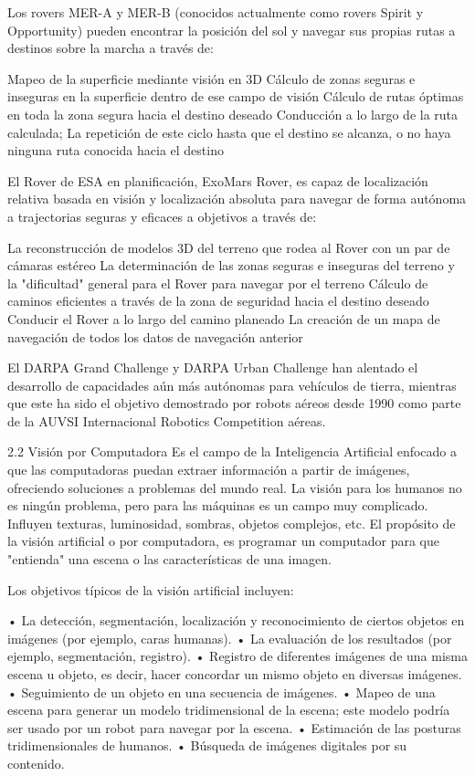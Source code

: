 Los rovers MER-A y MER-B (conocidos actualmente como rovers Spirit y Opportunity) pueden encontrar la posición del sol y navegar sus propias rutas a destinos sobre la marcha a través de: 

Mapeo de la superficie mediante visión en 3D 
Cálculo de zonas seguras e inseguras en la superficie dentro de ese campo de visión 
Cálculo de rutas óptimas en toda la zona segura hacia el destino deseado 
Conducción a lo largo de la ruta calculada; 
La repetición de este ciclo hasta que el destino se alcanza, o no haya ninguna ruta conocida hacia el destino

El Rover de ESA en planificación, ExoMars Rover, es capaz de localización relativa basada en visión y localización absoluta para navegar de forma autónoma a trajectorias seguras y eficaces a objetivos a través de: 

La reconstrucción de modelos 3D del terreno que rodea al Rover con un par de cámaras estéreo 
La determinación de las zonas seguras e inseguras del terreno y la "dificultad" general para el Rover para navegar por el terreno 
Cálculo de caminos eficientes a través de la zona de seguridad hacia el destino deseado 
Conducir el Rover a lo largo del camino planeado 
La creación de un mapa de navegación de todos los datos de navegación anterior 

El DARPA Grand Challenge y DARPA Urban Challenge han alentado el desarrollo de capacidades aún más autónomas para vehículos de tierra, mientras que este ha sido el objetivo demostrado por robots aéreos desde 1990 como parte de la AUVSI Internacional Robotics Competition aéreas.

2.2	Visión por Computadora
Es el campo de la Inteligencia Artificial enfocado a que las computadoras puedan extraer información a partir de imágenes, ofreciendo soluciones a problemas del mundo real. La visión para los humanos no es ningún problema, pero para las máquinas es un campo muy complicado. Influyen texturas, luminosidad, sombras, objetos complejos, etc.
El propósito de la visión artificial o por computadora, es programar un computador para que "entienda" una escena o las características de una imagen.

Los objetivos típicos de la visión artificial incluyen:

•	La detección, segmentación, localización y reconocimiento de ciertos objetos en imágenes (por ejemplo, caras humanas).
•	La evaluación de los resultados (por ejemplo, segmentación, registro).
•	Registro de diferentes imágenes de una misma escena u objeto, es decir, hacer concordar un mismo objeto en diversas imágenes.
•	Seguimiento de un objeto en una secuencia de imágenes.
•	Mapeo de una escena para generar un modelo tridimensional de la escena; este modelo podría ser usado por un robot para navegar por la escena.
•	Estimación de las posturas tridimensionales de humanos.
•	Búsqueda de imágenes digitales por su contenido.

